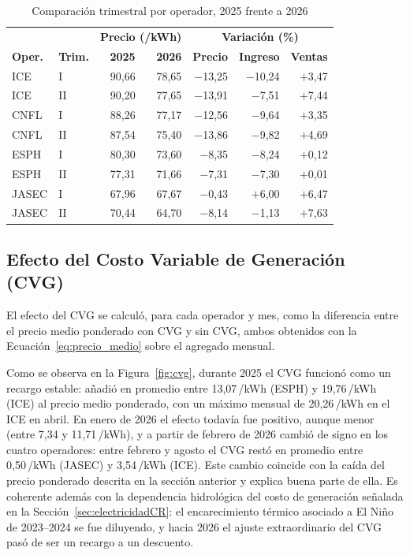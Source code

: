 \documentclass[conference]{IEEEtran}
\newcommand{\crc}{\textcolonmonetary} %
\begin{document}
\begin{table}[htbp]
\caption{Comparaci\'on trimestral por operador, 2025 frente a 2026}
\label{tab:trimestral}
\centering
\scriptsize
\renewcommand{\arraystretch}{1.15}
\begin{tabular*}{\columnwidth}{@{\extracolsep{\fill}}llrrrrr@{}}
\hline
 & & \multicolumn{2}{c}{\textbf{Precio (\crc/kWh)}} & \multicolumn{3}{c}{\textbf{Variaci\'on (\%)}} \\
\textbf{Oper.} & \textbf{Trim.} & \textbf{2025} & \textbf{2026} & \textbf{Precio} & \textbf{Ingreso} & \textbf{Ventas} \\
\hline
ICE   & I  & 90,66 & 78,65 & $-$13,25 & $-$10,24 & $+$3,47 \\
ICE   & II & 90,20 & 77,65 & $-$13,91 & $-$7,51  & $+$7,44 \\
CNFL  & I  & 88,26 & 77,17 & $-$12,56 & $-$9,64  & $+$3,35 \\
CNFL  & II & 87,54 & 75,40 & $-$13,86 & $-$9,82  & $+$4,69 \\
ESPH  & I  & 80,30 & 73,60 & $-$8,35  & $-$8,24  & $+$0,12 \\
ESPH  & II & 77,31 & 71,66 & $-$7,31  & $-$7,30  & $+$0,01 \\
JASEC & I  & 67,96 & 67,67 & $-$0,43  & $+$6,00  & $+$6,47 \\
JASEC & II & 70,44 & 64,70 & $-$8,14  & $-$1,13  & $+$7,63 \\
\hline
\end{tabular*}
\end{table}
\FloatBarrier

\subsection{Efecto del Costo Variable de Generaci\'on (CVG)}

El efecto del CVG se calcul\'o, para cada operador y mes, como la diferencia entre el precio medio ponderado con CVG y sin CVG, ambos obtenidos con la Ecuaci\'on~\eqref{eq:precio_medio} sobre el agregado mensual.

Como se observa en la Figura~\ref{fig:cvg}, durante 2025 el CVG funcion\'o como un recargo estable: a\~nadi\'o en promedio entre 13,07\,\crc/kWh (ESPH) y 19,76\,\crc/kWh (ICE) al precio medio ponderado, con un m\'aximo mensual de 20,26\,\crc/kWh en el ICE en abril. En enero de 2026 el efecto todav\'ia fue positivo, aunque menor (entre 7,34 y 11,71\,\crc/kWh), y a partir de febrero de 2026 cambi\'o de signo en los cuatro operadores: entre febrero y agosto el CVG rest\'o en promedio entre 0,50\,\crc/kWh (JASEC) y 3,54\,\crc/kWh (ICE). Este cambio coincide con la ca\'ida del precio ponderado descrita en la secci\'on anterior y explica buena parte de ella. Es coherente adem\'as con la dependencia hidrol\'ogica del costo de generaci\'on se\~nalada en la Secci\'on~\ref{sec:electricidadCR}: el encarecimiento t\'ermico asociado a El Ni\~no de 2023--2024 se fue diluyendo, y hacia 2026 el ajuste extraordinario del CVG pas\'o de ser un recargo a un descuento.
\end{document}
